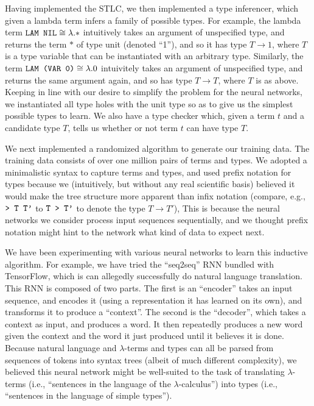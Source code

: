 \documentclass{amsart}
\begin{document}
Having implemented the STLC, we then implemented a type inferencer,
which given a lambda term infers a family of possible types. For
example, the lambda term $\verb!LAM NIL! \cong \lambda.*$ intuitively
takes an argument of unspecified type, and returns the term $*$ of
type unit (denoted ``1''), and so it has type $T \to 1$, where $T$ is
a type variable that can be instantiated with an arbitrary
type. Similarly, the term $\verb!LAM (VAR 0)! \cong \lambda.0$
intuivitely takes an argument of unspecified type, and returns the
same argument again, and so has type $T \to T$, where $T$ is as above.
Keeping in line with our desire to simplify the problem for the neural
networks, we instantiated all type holes with the unit type so as to
give us the simplest possible types to learn. We also have a type
checker which, given a term $t$ and a candidate type $T$, tells us
whether or not term $t$ can have type $T$.

We next implemented a randomized algorithm to generate our training
data. The training data consists of over one million pairs of terms
and types. We adopted a minimalistic syntax to capture terms and
types, and used prefix notation for types because we (intuitively, but
without any real scientific basis) believed it would make the tree
structure more apparent than infix notation (compare, e.g.,
$\verb!> T T'!$ to $\verb!T > T'!$ to denote the type $T \to T'$),
This is because the neural networks we consider process input
sequences sequentially, and we thought prefix notation might hint to
the network what kind of data to expect next.

We have been experimenting with various neural networks to learn this
inductive algorithm. For example, we have tried the ``seq2seq'' RNN
bundled with TensorFlow, which is can allegedly successfully do
natural language translation. This RNN is composed of two parts. The
first is an ``encoder'' takes an input sequence, and encodes it (using
a representation it has learned on its own), and transforms it to
produce a ``context''. The second is the ``decoder'', which takes a
context as input, and produces a word. It then repeatedly produces a
new word given the context and the word it just produced until it
believes it is done. Because natural language and $\lambda$-terms and
types can all be parsed from sequences of tokens into syntax trees
(albeit of much different complexity), we believed this neural network
might be well-suited to the task of translating $\lambda$-terms (i.e.,
``sentences in the language of the $\lambda$-calculus'') into types
(i.e., ``sentences in the language of simple types'').
\end{document}
